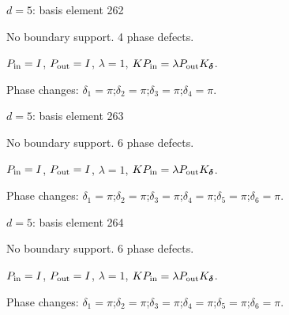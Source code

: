 {\Large $d=5$: basis element 262}\par
No boundary support. 4 phase defects.
\begin{center}
\end{center}
\vspace{-1mm}
$P_{\rm in}=I$, \quad $P_{\rm out}=I$, \quad $\lambda=1$, \qquad $K P_{\rm in}=\lambda P_{\rm out}K_{\boldsymbol\delta}$.
\par\smallskip\begin{minipage}{.98\linewidth}\small Phase changes: $\delta_{1}=\pi$;\quad $\delta_{2}=\pi$;\quad $\delta_{3}=\pi$;\quad $\delta_{4}=\pi$.\end{minipage}
\vfill
{\footnotesize\texttt{}}
\newpage
{}
{\Large $d=5$: basis element 263}\par
No boundary support. 6 phase defects.
\begin{center}
\end{center}
\vspace{-1mm}
$P_{\rm in}=I$, \quad $P_{\rm out}=I$, \quad $\lambda=1$, \qquad $K P_{\rm in}=\lambda P_{\rm out}K_{\boldsymbol\delta}$.
\par\smallskip\begin{minipage}{.98\linewidth}\small Phase changes: $\delta_{1}=\pi$;\quad $\delta_{2}=\pi$;\quad $\delta_{3}=\pi$;\quad $\delta_{4}=\pi$;\quad $\delta_{5}=\pi$;\quad $\delta_{6}=\pi$.\end{minipage}
\vfill
{\footnotesize\texttt{}}
\newpage
{}
{\Large $d=5$: basis element 264}\par
No boundary support. 6 phase defects.
\begin{center}
\end{center}
\vspace{-1mm}
$P_{\rm in}=I$, \quad $P_{\rm out}=I$, \quad $\lambda=1$, \qquad $K P_{\rm in}=\lambda P_{\rm out}K_{\boldsymbol\delta}$.
\par\smallskip\begin{minipage}{.98\linewidth}\small Phase changes: $\delta_{1}=\pi$;\quad $\delta_{2}=\pi$;\quad $\delta_{3}=\pi$;\quad $\delta_{4}=\pi$;\quad $\delta_{5}=\pi$;\quad $\delta_{6}=\pi$.\end{minipage}
\vfill
{\footnotesize\texttt{}}
\newpage
